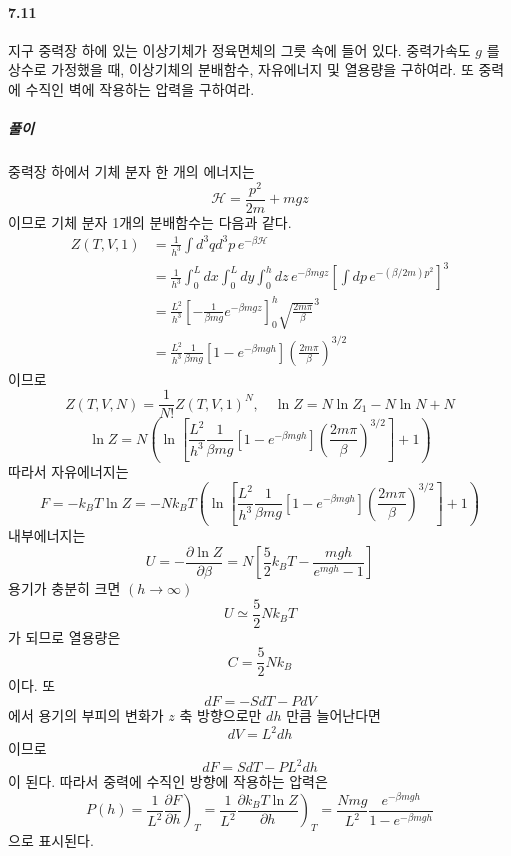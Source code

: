 \documentclass[a4paper,12pt]{report}
\newcommand{\Maxwell}[3][]{\left.\frac{\partial #2}{\partial #3} \right)_{#1} }
\begin{document}
	\paragraph{7.11 } 지구 중력장 하에 있는 이상기체가 정육면체의 그릇 속에 들어 있다. 중력가속도 $g$ 를 상수로 가정했을 때, 이상기체의 분배함수, 자유에너지 및 열용량을 구하여라. 또 중력에 수직인 벽에 작용하는 압력을 구하여라.
	\subparagraph{풀이} 중력장 하에서 기체 분자 한 개의 에너지는 
	$$\mathcal{H}=\frac{p^2}{2m}+mgz$$ 이므로 기체 분자 1개의 분배함수는 다음과 같다.
	\begin{equation*}
		\begin{split}
		Z(T,V,1)&=\frac{1}{h^3}\int d^3q d^3p\,e^{-\beta\mathcal{H}}\\
		&=\frac{1}{h^3}\int_{0}^{L}dx\int_{0}^{L}dy\int_{0}^{h}dz\,e^{-\beta mgz}\left[\int dp\,e^{-(\beta/2m)p^2} \right]^3\\
		&=\frac{L^2}{h^3}\left[-\frac{1}{\beta mg}e^{-\beta mgz} \right]_{0}^{h}\sqrt{\frac{2m\pi}{\beta}}^3  \\
		&=\frac{L^2}{h^3}\frac{1}{\beta mg}\left[1-e^{-\beta mgh} \right]\left(\frac{2m\pi}{\beta}\right)^{3/2} 
		\end{split}
	\end{equation*}
	이므로
	$$Z(T,V,N)=\frac{1}{N!}Z(T,V,1)^N,\quad \ln Z=N\ln Z_1-N\ln N+N$$
	$$\ln Z=N\left(\ln\left[\frac{L^2}{h^3}\frac{1}{\beta mg}\left[1-e^{-\beta mgh} \right]\left(\frac{2m\pi}{\beta}\right)^{3/2} \right] +1 \right) $$
	따라서 자유에너지는
	$$F=-k_BT\ln Z=-Nk_BT\left(\ln\left[\frac{L^2}{h^3}\frac{1}{\beta mg}\left[1-e^{-\beta mgh} \right]\left(\frac{2m\pi}{\beta}\right)^{3/2} \right] +1 \right)$$
	내부에너지는
	$$U=-\frac{\partial \ln Z}{\partial \beta}=N\left[\frac{5}{2}k_BT-\frac{mgh}{e^{mgh}-1} \right] $$
	용기가 충분히 크면 $(h\rightarrow \infty)$
	$$U\simeq \frac{5}{2}Nk_BT$$ 가 되므로 열용량은
	$$C=\frac{5}{2}Nk_B$$ 이다. 또 
	$$dF=-SdT-PdV$$ 에서 용기의 부피의 변화가 $z$ 축 방향으로만 $dh$ 만큼 늘어난다면
	$$dV=L^2dh$$ 이므로
	$$dF=SdT-PL^2dh$$ 이 된다.  따라서 중력에 수직인 방향에 작용하는 압력은
	$$P(h)=\frac{1}{L^2}\Maxwell[T]{F}{h}=\frac{1}{L^2}\Maxwell[T]{k_BT\ln Z}{h}=\frac{Nmg}{L^2}\frac{e^{-\beta mgh}}{1-e^{-\beta mgh}}$$
	으로 표시된다. 
\end{document}
